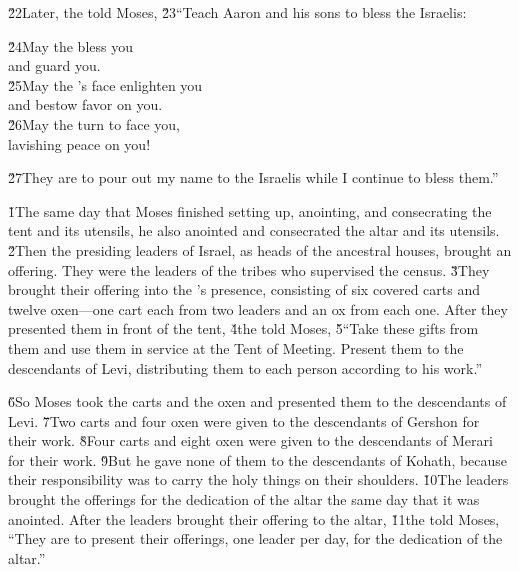 \v{22}Later, the  told Moses, \v{23}``Teach Aaron and his sons to bless the Israelis:

\begin{poetry}
\poeml \v{24}May the  bless you \\
\poemll    and guard you. \\
\poeml \v{25}May the 's face enlighten you \\
\poemll    and bestow favor on you. \\
\poeml \v{26}May the  turn to face you, \\
\poemll    lavishing peace on you!
\end{poetry}

\v{27}They are to pour out my name to the Israelis while I continue to bless them.''

\v{1}The same day that Moses finished setting up, anointing, and consecrating the tent and its utensils, he also anointed and consecrated the altar and its utensils. \v{2}Then the presiding leaders of Israel, as heads of the ancestral houses, brought an offering. They were the leaders of the tribes who supervised the census. \v{3}They brought their offering into the 's presence, consisting of six covered carts and twelve oxen---one cart each from two leaders and an ox from each one. After they presented them in front of the tent, \v{4}the  told Moses, \v{5}``Take these gifts from them and use them in service at the Tent of Meeting. Present them to the descendants of Levi, distributing them to each person according to his work.''

\v{6}So Moses took the carts and the oxen and presented them to the descendants of Levi. \v{7}Two carts and four oxen were given to the descendants of Gershon for their work. \v{8}Four carts and eight oxen were given to the descendants of Merari for their work. \v{9}But he gave none of them to the descendants of Kohath, because their responsibility was to carry the holy things on their shoulders. \v{10}The leaders brought the offerings for the dedication of the altar the same day that it was anointed. After the leaders brought their offering to the altar, \v{11}the  told Moses, ``They are to present their offerings, one leader per day, for the dedication of the altar.''


